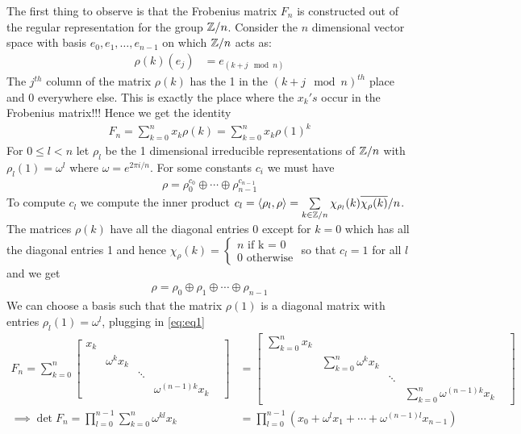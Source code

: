 The first thing to observe is that the Frobenius matrix $F_n$ is constructed out of the regular representation for the group $\mathbb{Z}/n$. Consider the $n$ dimensional vector space with basis $e_0, e_1, \ldots, e_{n-1}$ on which $\mathbb{Z}/n$ acts as:
\begin{align}
	\rho(k)(e_j) & = e_{(k+j \mod n)}
\end{align}
The $j^{th}$ column of the matrix $\rho(k)$ has the 1 in the $(k+j \mod n)^{th}$ place and 0 everywhere else. This is exactly the place where the $x_k's$ occur in the Frobenius matrix!!! Hence we get the identity
\begin{align}
	\label{eq:eq1}
	F_n = \sum \limits_{k=0}^n x_k \rho(k) = \sum \limits_{k=0}^n x_k \rho(1)^k
\end{align}
For $0 \le l < n$ let $\rho_l$ be the 1 dimensional irreducible representations of $\mathbb{Z}/n$ with $\rho_l(1) = \omega^l$ where $\omega = e^{2 \pi i /n}$. For some constants $c_i$ we must have
\begin{align}
	\rho = \rho_0 ^ {c_0} \oplus \cdots \oplus \rho_{n-1} ^ {c_{n-1}}
\end{align}
To compute $c_l$ we compute the inner product $c_l = \langle \rho_l, \rho \rangle=\sum \limits _ {k \in \mathbb{Z}/n} {\chi_{\rho_l}(k)} \overline{\chi_{\rho}(k)}/n$. The matrices $\rho(k)$ have all the diagonal entries 0 except for $k = 0$ which has all the diagonal entries 1 and hence $\chi_\rho(k) = \begin{cases} n \mbox{ if k = 0} \\ 0 \mbox{ otherwise} \end{cases}$ so that $c_l = 1$ for all $l$ and we get
\begin{align}
	\rho = \rho_0 \oplus \rho_1 \oplus \cdots \oplus \rho_{n-1}
\end{align}
We can choose a basis such that the matrix $\rho(1)$ is a diagonal matrix with entries $\rho_l(1) = \omega^l$, plugging in \eqref{eq:eq1}
\begin{align}
	F_n = \sum \limits_{k=0}^n \begin{bmatrix} x_k &   &   &   \\ &  \omega^k x_k & & \\ & & \ddots & \\ & & & \omega^{(n-1)k} x_k & \end{bmatrix}
	&=
	\begin{bmatrix} \sum \limits_{k=0}^n x_k       &   &   &   \\ & \sum \limits_{k=0}^n \omega^k x_k & & \\ & & \ddots & \\ & & & \sum \limits_{k=0}^n \omega^{(n-1)k}x_k & \end{bmatrix} \\
	\implies \det F_n	= \prod \limits_{l=0}^{n-1} \sum \limits_{k=0}^n \omega^{kl} x_k &= \prod \limits_{l=0}^{n-1}\left(x_0 + \omega^{l} x_1 + \cdots + \omega^{(n-1)l}x_{n-1}\right)
\end{align}
